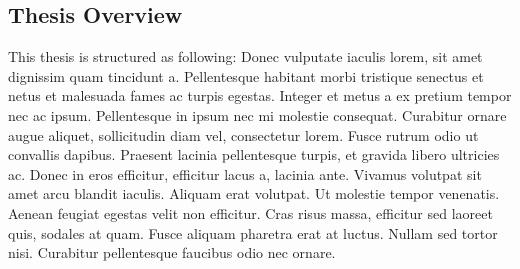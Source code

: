 \subsection{Thesis Overview}

This thesis is structured as following: Donec vulputate iaculis lorem, sit amet dignissim quam tincidunt a. Pellentesque habitant morbi tristique senectus et netus et malesuada fames ac turpis egestas. Integer et metus a ex pretium tempor nec ac ipsum. Pellentesque in ipsum nec mi molestie consequat. Curabitur ornare augue aliquet, sollicitudin diam vel, consectetur lorem. Fusce rutrum odio ut convallis dapibus. Praesent lacinia pellentesque turpis, et gravida libero ultricies ac. Donec in eros efficitur, efficitur lacus a, lacinia ante. Vivamus volutpat sit amet arcu blandit iaculis. Aliquam erat volutpat. Ut molestie tempor venenatis. Aenean feugiat egestas velit non efficitur. Cras risus massa, efficitur sed laoreet quis, sodales at quam. Fusce aliquam pharetra erat at luctus. Nullam sed tortor nisi. Curabitur pellentesque faucibus odio nec ornare. 